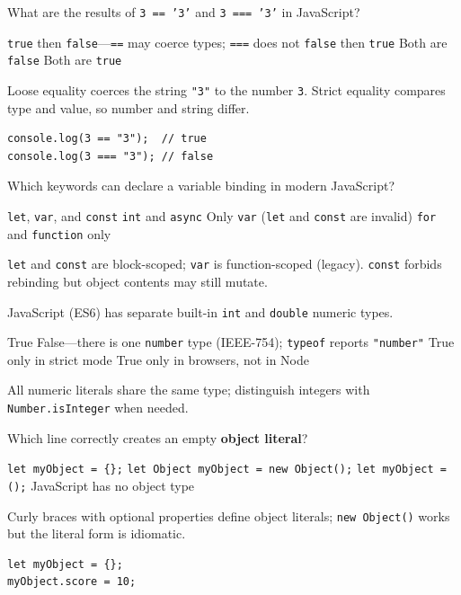 \question[4]
What are the results of \texttt{3 == '3'} and \texttt{3 === '3'} in JavaScript?
\begin{choices}
  \CorrectChoice \texttt{true} then \texttt{false}---\texttt{==} may coerce types; \texttt{===} does not
  \choice \texttt{false} then \texttt{true}
  \choice Both are \texttt{false}
  \choice Both are \texttt{true}
\end{choices}
\begin{solution}
  Loose equality coerces the string \texttt{"3"} to the number \texttt{3}. Strict equality compares type and value, so number and string differ.
\begin{lstlisting}[style=js]
console.log(3 == "3");  // true
console.log(3 === "3"); // false
\end{lstlisting}
\end{solution}

\question[4]
Which keywords can declare a variable binding in modern JavaScript?
\begin{choices}
  \CorrectChoice \texttt{let}, \texttt{var}, and \texttt{const}
  \choice \texttt{int} and \texttt{async}
  \choice Only \texttt{var} (\texttt{let} and \texttt{const} are invalid)
  \choice \texttt{for} and \texttt{function} only
\end{choices}
\begin{solution}
  \texttt{let} and \texttt{const} are block-scoped; \texttt{var} is function-scoped (legacy). \texttt{const} forbids rebinding but object contents may still mutate.
\end{solution}

\question[4]
JavaScript (ES6) has separate built-in \texttt{int} and \texttt{double} numeric types.
\begin{choices}
  \choice True
  \CorrectChoice False---there is one \texttt{number} type (IEEE-754); \texttt{typeof} reports \texttt{"number"}
  \choice True only in strict mode
  \choice True only in browsers, not in Node
\end{choices}
\begin{solution}
  All numeric literals share the same type; distinguish integers with \texttt{Number.isInteger} when needed.
\end{solution}

\question[4]
Which line correctly creates an empty \textbf{object literal}?
\begin{choices}
  \CorrectChoice \texttt{let myObject = \{\};}
  \choice \texttt{let Object myObject = new Object();}
  \choice \texttt{let myObject = ();}
  \choice JavaScript has no object type
\end{choices}
\begin{solution}
  Curly braces with optional properties define object literals; \texttt{new Object()} works but the literal form is idiomatic.
\begin{lstlisting}[style=js]
let myObject = {};
myObject.score = 10;
\end{lstlisting}
\end{solution}

